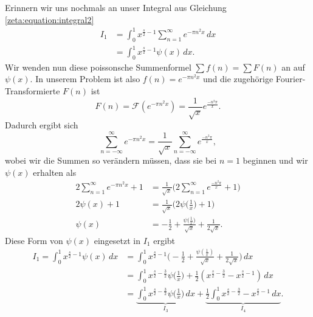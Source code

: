 Erinnern wir uns nochmals an unser Integral aus Gleichung \eqref{zeta:equation:integral2}
\begin{align*}
    I_1
    &=
    \int_0^{1}
    x^{\frac{s}{2}-1}
    \sum_{n=1}^{\infty}
    e^{-\pi n^2 x}
    \,dx
    \\
    &=
    \int_0^{1}
    x^{\frac{s}{2}-1}
    \psi(x)
    \,dx
    .
\end{align*}
Wir wenden nun diese poissonsche Summenformel $\sum f(n) = \sum F(n)$ an auf $\psi(x)$.
In unserem Problem ist also $f(n) =  e^{-\pi n^2 x}$ und die zugehörige Fourier-Transformierte $F(n)$ ist
\begin{equation}
    F(n)
    =
    \mathcal{F}
    (
    e^{-\pi n^2 x}
    )
    =
    \frac{1}{\sqrt{x}}
    e^{\frac{-n^2 \pi}{x}}.
\end{equation}
Dadurch ergibt sich
\begin{equation}\label{zeta:equation:psi}
    \sum_{n=-\infty}^{\infty}
    e^{-\pi n^2 x}
    =
    \frac{1}{\sqrt{x}}
    \sum_{n=-\infty}^{\infty}
    e^{\frac{-n^2 \pi}{x}},
\end{equation}
wobei wir die Summen so verändern müssen, dass sie bei $n=1$ beginnen und wir $\psi(x)$ erhalten als
\begin{align}
    2
    \sum_{n=1}^{\infty}
    e^{-\pi n^2 x}
    +
    1
    &=
    \frac{1}{\sqrt{x}}
    \Biggl(
    2
    \sum_{n=1}^{\infty}
    e^{\frac{-n^2 \pi}{x}}
    +
    1
    \Biggr)
    \\
    2
    \psi(x)
    +
    1
    &=
    \frac{1}{\sqrt{x}}
    \biggl(
    2
    \psi\biggl(\frac{1}{x}\biggr)
    +
    1
    \biggr)
    \\
    \psi(x)
    &=
    - \frac{1}{2}
    + \frac{\psi\biggl(\frac{1}{x} \biggr)}{\sqrt{x}}
    + \frac{1}{2 \sqrt{x}}.\label{zeta:equation:psi}
\end{align}
Diese Form von $\psi(x)$ eingesetzt in $I_1$ ergibt
\begin{align}
    I_1
    =
    \int_0^{1}
    x^{\frac{s}{2}-1}
    \psi(x)
    \,dx
    &=
    \int_0^{1}
    x^{\frac{s}{2}-1}
    \Biggl(
    - \frac{1}{2}
    + \frac{\psi(\frac{1}{x})}{\sqrt{x}}
    + \frac{1}{2 \sqrt{x}}
    \Biggr)
    \,dx
    \\
    &=
    \int_0^{1}
    x^{\frac{s}{2}-\frac{3}{2}}
    \psi \biggl( \frac{1}{x} \biggr)
    + \frac{1}{2}
    (
    x^{\frac{s}{2}-\frac{3}{2}}
    -
    x^{\frac{s}{2}-1}
    )
    \,dx
    \\
    &=
    \underbrace{
    \int_0^{1}
    x^{\frac{s}{2}-\frac{3}{2}}
    \psi \biggl( \frac{1}{x} \biggr)
    \,dx
    }_{\displaystyle{I_3}}
    +
    \underbrace{
    \frac{1}{2}
    \int_0^1
    x^{\frac{s}{2}-\frac{3}{2}}
    -
    x^{\frac{s}{2}-1}
    \,dx
    }_{\displaystyle{I_4}}. \label{zeta:equation:integral3}
\end{align}
